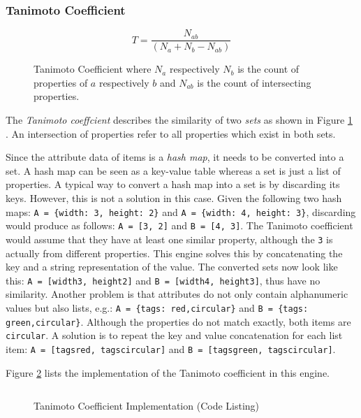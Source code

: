 \subsubsection{Tanimoto Coefficient}

\begin{figure}[ht]
    \[T = \frac{N_{ab}}{(N_a + N_b - N_{ab})}\]
    \caption[Tanimoto Coefficient]{Tanimoto Coefficient where \(N_a\) respectively \(N_b\) is the count of properties of \(a\) respectively \(b\) and \(N_{ab}\) is the count of intersecting properties.}
    \label{fig:implementation-itemsimilarity-tanimoto}
\end{figure}

The \emph{Tanimoto coeffcient} describes the similarity of two \emph{sets} as shown in Figure \ref{fig:implementation-itemsimilarity-tanimoto} \cite{segaran07}. An intersection of properties refer to all properties which exist in both sets.

Since the attribute data of items is a \emph{hash map}, it needs to be converted into a set. A hash map can be seen as a key-value table whereas a set is just a list of properties. A typical way to convert a hash map into a set is by discarding its keys. However, this is not a solution in this case. Given the following two hash maps: \texttt{A = \{width: 3, height: 2\}} and \texttt{A = \{width: 4, height: 3\}}, discarding would produce as follows: \texttt{A = [3, 2]} and \texttt{B = [4, 3]}. The Tanimoto coefficient would assume that they have at least one similar property, although the \texttt{3} is actually from different properties. This engine solves this by concatenating the key and a string representation of the value. The converted sets now look like this: \texttt{A = [width3, height2]} and \texttt{B = [width4, height3]}, thus have no similarity. Another problem is that attributes do not only contain alphanumeric values but also lists, e.g.: \texttt{A = \{tags: red,circular\}} and \texttt{B = \{tags: green,circular\}}. Although the properties do not match exactly, both items are \texttt{circular}. A solution is to repeat the key and value concatenation for each list item: \texttt{A = [tagsred, tagscircular]} and \texttt{B = [tagsgreen, tagscircular]}.

Figure \ref{fig:implementation-itemsimilarity-tanimotocode} lists the implementation of the Tanimoto coefficient in this engine.

\begin{figure}[!ht]
    \inputminted{php}{./includes/source/engines/itemSimilarity/src/Koklu/Model/Similarity/TanimotoCoefficient.php}
    \caption{Tanimoto Coefficient Implementation (Code Listing)}
    \label{fig:implementation-itemsimilarity-tanimotocode}
\end{figure}

